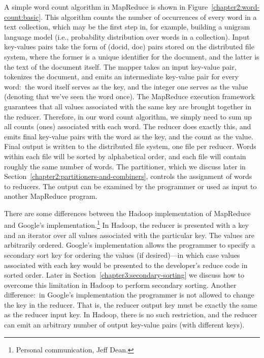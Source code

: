 A simple word count algorithm in MapReduce is shown in
Figure~\ref{chapter2:word-count:basic}.  This algorithm counts the
number of occurrences of every word in a text collection, which may be
the first step in, for example, building a unigram language model
(i.e., probability distribution over words in a collection).  Input
key-values pairs take the form of (docid, doc) pairs stored on the
distributed file system, where the former is a unique identifier for
the document, and the latter is the text of the document itself.  The
mapper takes an input key-value pair, tokenizes the document, and
emits an intermediate key-value pair for every word:\ the word itself
serves as the key, and the integer one serves as the value (denoting
that we've seen the word once).  The MapReduce execution framework
guarantees that all values associated with the same key are brought
together in the reducer.  Therefore, in our word count algorithm, we
simply need to sum up all counts (ones) associated with each word.
The reducer does exactly this, and emits final key-value pairs with
the word as the key, and the count as the value.  Final output is
written to the distributed file system, one file per reducer.  Words
within each file will be sorted by alphabetical order, and each file
will contain roughly the same number of words.  The partitioner, which
we discuss later in Section~\ref{chapter2:partitioners-and-combiners},
controls the assignment of words to reducers.  The output can be
examined by the programmer or used as input to another MapReduce
program.

There are some differences between the Hadoop implementation of
MapReduce and Google's implementation.\footnote{Personal
communication, Jeff Dean.}  In Hadoop, the reducer is presented with a
key and an iterator over all values associated with the particular
key.  The values are arbitrarily ordered.  Google's implementation
allows the programmer to specify a secondary sort key for ordering the
values (if desired)---in which case values associated with each key
would be presented to the developer's reduce code in sorted order.
Later in Section~\ref{chapter3:secondary-sorting} we discuss how to
overcome this limitation in Hadoop to perform secondary sorting.
Another difference:\ in Google's implementation the programmer is not
allowed to change the key in the reducer.  That is, the reducer output
key must be exactly the same as the reducer input key.  In Hadoop,
there is no such restriction, and the reducer can emit an arbitrary
number of output key-value pairs (with different keys).

